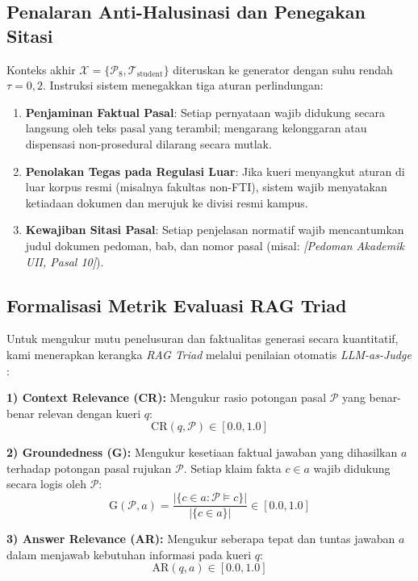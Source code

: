 \documentclass[conference]{IEEEtran}
\begin{document}
\subsection{Penalaran Anti-Halusinasi dan Penegakan Sitasi}
Konteks akhir $\mathcal{X} = \{\mathcal{P}_8, \mathcal{T}_{\text{student}}\}$ diteruskan ke generator dengan suhu rendah $\tau = 0,2$. Instruksi sistem menegakkan tiga aturan perlindungan:
\begin{enumerate}
    \item \textbf{Penjaminan Faktual Pasal}: Setiap pernyataan wajib didukung secara langsung oleh teks pasal yang terambil; mengarang kelonggaran atau dispensasi non-prosedural dilarang secara mutlak.
    \item \textbf{Penolakan Tegas pada Regulasi Luar}: Jika kueri menyangkut aturan di luar korpus resmi (misalnya fakultas non-FTI), sistem wajib menyatakan ketiadaan dokumen dan merujuk ke divisi resmi kampus.
    \item \textbf{Kewajiban Sitasi Pasal}: Setiap penjelasan normatif wajib mencantumkan judul dokumen pedoman, bab, dan nomor pasal (misal: \textit{[Pedoman Akademik UII, Pasal 10]}).
\end{enumerate}

\subsection{Formalisasi Metrik Evaluasi RAG Triad}
Untuk mengukur mutu penelusuran dan faktualitas generasi secara kuantitatif, kami menerapkan kerangka \textit{RAG Triad} melalui penilaian otomatis \textit{LLM-as-Judge} \cite{es2023ragas, saad2023trulens}:

\textbf{1) Context Relevance (CR):} Mengukur rasio potongan pasal $\mathcal{P}$ yang benar-benar relevan dengan kueri $q$:
\begin{equation}
\text{CR}(q, \mathcal{P}) \in [0.0, 1.0]
\end{equation}

\textbf{2) Groundedness (G):} Mengukur kesetiaan faktual jawaban yang dihasilkan $a$ terhadap potongan pasal rujukan $\mathcal{P}$. Setiap klaim fakta $c \in a$ wajib didukung secara logis oleh $\mathcal{P}$:
\begin{equation}
\text{G}(\mathcal{P}, a) = \frac{|\{c \in a : \mathcal{P} \models c\}|}{|\{c \in a\}|} \in [0.0, 1.0]
\end{equation}

\textbf{3) Answer Relevance (AR):} Mengukur seberapa tepat dan tuntas jawaban $a$ dalam menjawab kebutuhan informasi pada kueri $q$:
\begin{equation}
\text{AR}(q, a) \in [0.0, 1.0]
\end{equation}
\end{document}
